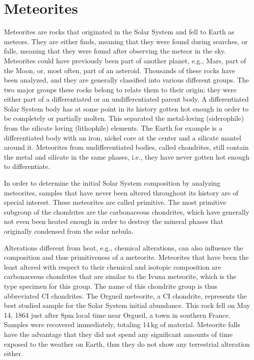 \section{Meteorites}\label{sec:sol_abu_meteorites}

Meteorites are rocks that originated in the Solar System and fell to Earth as meteors. They are either finds, meaning that they were found during searches, or falls, meaning that they were found after observing the meteor in the sky. Meteorites could have previously been part of another planet, e.g., Mars, part of the Moon, or, most often, part of an asteroid. Thousands of these rocks have been analyzed, and they are generally classified into various different groups. The two major groups these rocks belong to relate them to their origin; they were either part of a differentiated or an undifferentiated parent body. A differentiated Solar System body has at some point in its history gotten hot enough in order to be completely or partially molten. This separated the metal-loving (siderophile) from the silicate loving (lithophile) elements. The Earth for example is a differentiated body with an iron, nickel core at the center and a silicate mantel around it. Meteorites from undifferentiated bodies, called chondrites, still contain the metal and silicate in the same phases, i.e., they have never gotten hot enough to differentiate. 

In order to determine the initial Solar System composition by analyzing meteorites, samples that have never been altered throughout its history are of special interest. These meteorites are called primitive. The most primitive subgroup of the chondrites are the carbonaceous chondrites, which have generally not even been heated enough in order to destroy the mineral phases that originally condensed from the solar nebula.

Alterations different from heat, e.g., chemical alterations, can also influence the composition and thus primitiveness of a meteorite. Meteorites that have been the least altered with respect to their chemical and isotopic composition are carbonaceous chondrites that are similar to the Ivuna meteorite, which is the type specimen for this group. The name of this chondrite group is thus abbreviated CI chondrites. The Orgueil meteorite, a CI chondrite, represents the best studied sample for the Solar System initial abundance. This rock fell on May 14, 1864 just after 8pm local time near Orgueil, a town in southern France. Samples were recovered immediately, totaling 14\,kg of material. Meteorite falls have the advantage that they did not spend any significant amounts of time exposed to the weather on Earth, thus they do not show any terrestrial alteration either. 

